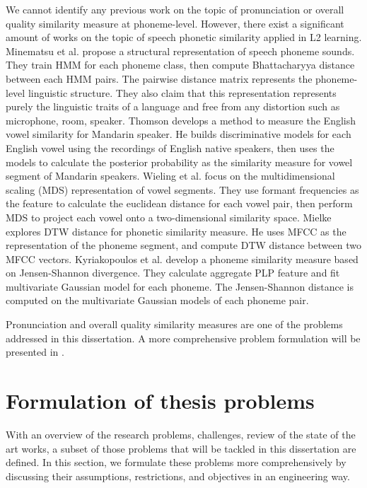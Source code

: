 We cannot identify any previous work on the topic of pronunciation or overall quality similarity measure at phoneme-level. However, there exist a significant amount of works on the topic of speech phonetic similarity applied in L2 learning. Minematsu et al. \cite{Minematsu2004, Minematsu2007, Shiozawa2016} propose a structural representation of speech phoneme sounds. They train \gls{HMM} for each phoneme class, then compute Bhattacharyya distance between each \gls{HMM} pairs. The pairwise distance matrix represents the phoneme-level linguistic structure. They also claim that this representation represents purely the linguistic traits of a language and free from any distortion such as microphone, room, speaker. Thomson \cite{Thomson2008} develops a method to measure the English vowel similarity for Mandarin speaker. He builds discriminative models for each English vowel using the recordings of English native speakers, then uses the models to calculate the posterior probability as the similarity measure for vowel segment of Mandarin speakers. Wieling et al. \cite{Wieling2011} focus on the multidimensional scaling (MDS) representation of vowel segments. They use formant frequencies as the feature to calculate the euclidean distance for each vowel pair, then perform MDS to project each vowel onto a two-dimensional similarity space. Mielke \cite{Mielke2012} explores \gls{DTW} distance for phonetic similarity measure. He uses \gls{MFCC} as the representation of the phoneme segment, and compute \gls{DTW} distance between two \gls{MFCC} vectors. Kyriakopoulos et al. \cite{Kyriakopoulos2017} develop a phoneme similarity measure based on Jensen-Shannon divergence. They calculate aggregate PLP feature and fit multivariate Gaussian model for each phoneme. The Jensen-Shannon distance is computed on the multivariate Gaussian models of each phoneme pair.

Pronunciation and overall quality similarity measures are one of the problems addressed in this dissertation. A more comprehensive problem formulation will be presented in .

\section{Formulation of thesis problems}\label{sec:ch3:formulation}

With an overview of the research problems, challenges, review of the state of the art works, a subset of those problems that will be tackled in this dissertation are defined. In this section, we formulate these problems more comprehensively by discussing their assumptions, restrictions, and objectives in an engineering way.

